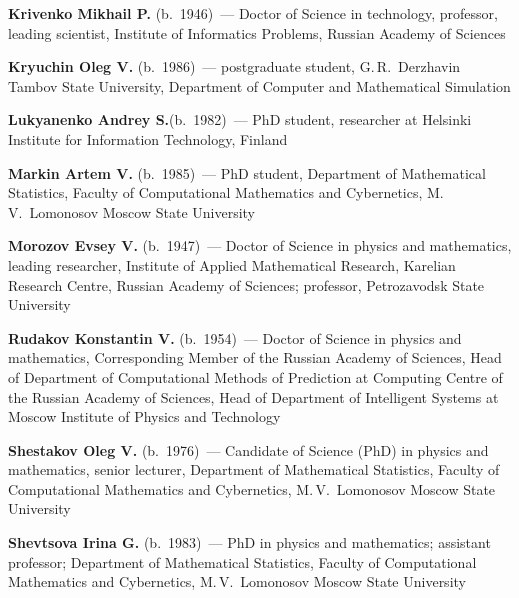 \begin{multicols}{2}
\noindent
\textbf{Krivenko Mikhail P.} (b.\ 1946)~--- 
Doctor of Science in technology, professor, leading scientist, 
Institute of Informatics Problems, Russian Academy of Sciences  

\vspace*{3pt}

\noindent
\textbf{Kryuchin Oleg V.} (b.\ 1986)~---  postgraduate student,
G.\,R.~Derzhavin Tambov State University, Department of Computer and Mathematical Simulation 

\columnbreak

\noindent
\textbf{Lukyanenko Andrey S.}(b.\ 1982)~--- PhD student, researcher at    
Helsinki Institute for Information Technology, Finland

\vspace*{3pt}


\noindent
\textbf{Markin Artem V.} (b.\ 1985)~--- PhD student, Department of Mathematical Statistics, 
Faculty of Computational Mathematics and Cybernetics, M.\,V.~Lomonosov Moscow State University

\vspace*{3pt}

\noindent
\textbf{Morozov Evsey V.} (b.\ 1947)~--- Doctor of Science in physics and mathematics, 
leading researcher, Institute of Applied Mathematical  Research, 
Karelian Research Centre, Russian Academy of Sciences; professor, Petrozavodsk State University

\vspace*{3pt}

\noindent
\textbf{Rudakov Konstantin V.} (b.\ 1954)~--- Doctor of Science in physics and mathematics, 
Corresponding Member of the Russian Academy of Sciences, 
Head of Department of Computational Methods of Prediction at Computing Centre of the
Russian Academy of Sciences, 
Head of Department of Intelligent Systems at Moscow Institute of
Physics and Technology 

\vspace*{3pt}

\noindent
\textbf{Shestakov Oleg V.} (b.\ 1976)~--- Candidate of Science (PhD) in 
physics and mathematics, senior lecturer, Department of Mathematical Statistics, Faculty of 
Computational Mathematics and Cybernetics, M.\,V.~Lomonosov Moscow State University

\vspace*{3pt}

\noindent
\textbf{Shevtsova Irina G.} (b.\ 1983)~--- PhD in physics and mathematics; 
assistant professor; Department of Mathematical Statistics, Faculty of Computational Mathematics and Cybernetics, 
M.\,V.~Lomonosov Moscow State University


\end{multicols}
